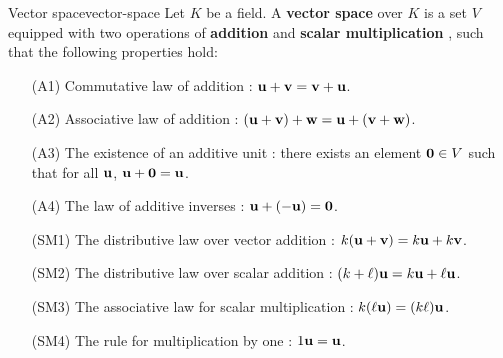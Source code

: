 \begin{definition}{Vector space}{vector-space}
  Let $K$ be a field. A \textbf{vector space} over $K$%
   is a set $V$ equipped with two operations of
  \textbf{addition}%
    and
  \textbf{scalar multiplication}%
  , such that the following properties hold:
  \begin{itemize}\setlength\itemsep{0em}
  \item[(A1)] Commutative law of addition%
    :
    $\mbox{\bf u} + \mbox{\bf v}=\mbox{\bf v} + \mbox{\bf u}$.
  \item[(A2)] Associative law of addition%
    :
    $(\mbox{\bf u} + \mbox{\bf v}) + \mbox{\bf w}=\mbox{\bf u} + (\mbox{\bf v} + \mbox{\bf w})$.
  \item[(A3)] The existence of an additive unit%
    : there exists an element $\mbox{\bf 0}\in
    V$ such that for all $\mbox{\bf u}$,
    $\mbox{\bf u} + \mbox{\bf 0}=\mbox{\bf u}$.
  \item[(A4)] The law of additive inverses%
    :
    $\mbox{\bf u} + (-\mbox{\bf u}) =\mbox{\bf 0}$.
  \item[(SM1)] The distributive law over vector addition%
    :
    $k(\mbox{\bf u} + \mbox{\bf v}) = k\mbox{\bf u} + k\mbox{\bf v}$.
  \item[(SM2)] The distributive law over scalar addition%
    :
    $(k + \ell) \mbox{\bf u} = k \mbox{\bf u} + \ell\mbox{\bf u}$.
  \item[(SM3)] The associative law for scalar multiplication%
    :
    $k(\ell\mbox{\bf u}) = (k \ell)\mbox{\bf u}$.
  \item[(SM4)] The rule for multiplication by one%
    :
    $1\mbox{\bf u}=\mbox{\bf u}$.
  \end{itemize}
\end{definition}

